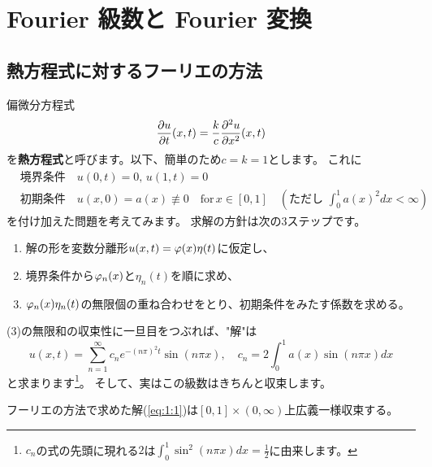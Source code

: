 \documentclass[report]{jlreq}
\begin{document}
%
\chapter{Fourier 級数と Fourier 変換}

%
\section{熱方程式に対するフーリエの方法}

偏微分方程式
\begin{equation}
    \deldel[u]{t}(x, t) = \frac{k}{c} \frac{\del^2 u}{\del x^2}(x, t)
\end{equation}
を\textbf{熱方程式}と呼びます。以下、簡単のため$c = k = 1$とします。
これに
\begin{equation}
    \begin{split}
        &\text{境界条件}\quad u(0, t) = 0,\, u(1, t) = 0 \\
        &\text{初期条件}\quad u(x, 0) = a(x) \not\equiv 0 \quad \text{for}\, x \in [0, 1]
            \quad \left(\text{ただし } \int_0^1 a(x)^2 dx < \infty \right)
    \end{split}
\end{equation}
を付け加えた問題を考えてみます。
求解の方針は次の3ステップです。
\begin{enumerate}
    \item 解の形を変数分離形$u(x, t) = \varphi(x) \eta(t)$に仮定し、
    \item 境界条件から$\varphi_n(x)$と$\eta_n(t)$を順に求め、
    \item $\varphi_n(x) \eta_n(t)$の無限個の重ね合わせをとり、初期条件をみたす係数を求める。
\end{enumerate}
(3)の無限和の収束性に一旦目をつぶれば、"解"は
\begin{equation}
    u(x, t) = \sum_{n = 1}^\infty c_n e^{-(n\pi)^2 t} \sin (n\pi x),\quad
    c_n = 2 \int_0^1 a(x) \sin(n\pi x) dx
    \label{eq:1:1}
\end{equation}
と求まります\footnote{
    $c_n$の式の先頭に現れる$2$は$\int_0^1 \sin^2(n\pi x) dx = \frac{1}{2}$に由来します。
}。
そして、実はこの級数はきちんと収束します。


\begin{proposition}
    フーリエの方法で求めた解(\ref{eq:1:1})は$[0, 1] \times (0, \infty)$上広義一様収束する。
\end{proposition}
\end{document}
